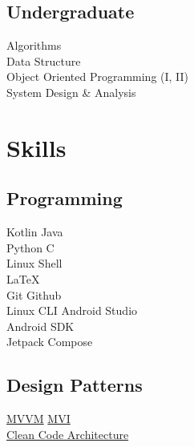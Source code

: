 \documentclass[]{deedy-resume-openfont}
\begin{document}
\begin{minipage}[t]{0.33\textwidth}
\subsection{Undergraduate}
Algorithms\\
Data Structure\\
Object Oriented Programming (I, II)\\
System Design \& Analysis



\section{Skills}
\subsection{Programming}
\textbullet{} Kotlin \textbullet{} Java \\
\textbullet{} Python \textbullet{} C \\
\textbullet{} Linux Shell \\
\textbullet{}\LaTeX\ \\ 
\textbullet{} Git \textbullet{} Github \\
\textbullet{} Linux CLI \textbullet{} Android Studio\\
\textbullet{} Android SDK \\
\textbullet{} Jetpack Compose \\
\quad
\subsection{Design Patterns}
\textbullet{} \href{https://androiddevhub.com/mvvm-architecture-in-jetpack-compose/}{MVVM}
\textbullet{} \href{https://chahatkushwaha.medium.com/mvi-architecture-with-android-fee57133ccbc}{MVI} \\
\textbullet{} \href{https://www.geeksforgeeks.org/what-is-clean-architecture-in-android/}{Clean Code Architecture}

\sectionsep
%
%

\end{minipage} 
\hfill
\end{document}
